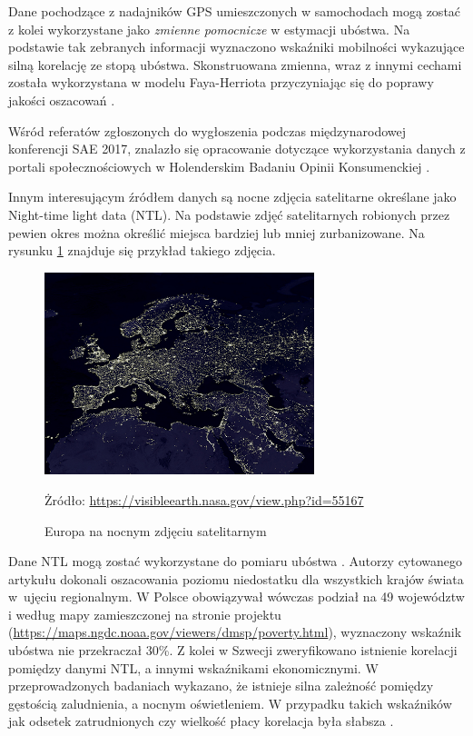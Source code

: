 Dane pochodzące z nadajników GPS umieszczonych w samochodach mogą zostać z kolei wykorzystane jako \textit{zmienne pomocnicze} w estymacji ubóstwa. Na podstawie tak zebranych informacji wyznaczono wskaźniki mobilności wykazujące silną korelację ze stopą ubóstwa. Skonstruowana zmienna, wraz z innymi cechami została wykorzystana w modelu Faya-Herriota przyczyniając się do poprawy jakości oszacowań \citep{marchetti2015}. 

Wśród referatów zgłoszonych do wygłoszenia podczas międzynarodowej konferencji SAE 2017, znalazło się opracowanie dotyczące wykorzystania danych z portali społecznościowych w Holenderskim Badaniu Opinii Konsumenckiej \citep{brakel2017}.

Innym interesującym źródłem danych są nocne zdjęcia satelitarne określane jako Night-time light data (NTL). Na podstawie zdjęć satelitarnych robionych przez pewien okres można określić miejsca bardziej lub mniej zurbanizowane. Na rysunku \ref{fig:ntl} znajduje się przykład takiego zdjęcia. 

\begin{figure}[ht]
\begin{center}
\includegraphics[width=0.7\textwidth]{02_wykresy/europe-nightlights-580.jpg}
\end{center}
\caption{Europa na nocnym zdjęciu satelitarnym}
\small{Żródło: \url{https://visibleearth.nasa.gov/view.php?id=55167}}
\label{fig:ntl}
\end{figure}

Dane NTL mogą zostać wykorzystane do pomiaru ubóstwa \citep{ntl2009}. Autorzy cytowanego artykułu dokonali oszacowania poziomu niedostatku dla wszystkich krajów świata w~ujęciu regionalnym. W Polsce obowiązywał wówczas podział na 49 województw i według mapy zamieszczonej na stronie projektu (\url{https://maps.ngdc.noaa.gov/viewers/dmsp/poverty.html}), wyznaczony wskaźnik ubóstwa nie przekraczał 30\%. Z kolei w Szwecji zweryfikowano istnienie korelacji pomiędzy danymi NTL, a innymi wskaźnikami ekonomicznymi. W przeprowadzonych badaniach wykazano, że istnieje silna zależność pomiędzy gęstością zaludnienia, a nocnym oświetleniem. W przypadku takich wskaźników jak odsetek zatrudnionych czy wielkość płacy korelacja była słabsza \citep{ntl2015}. 


